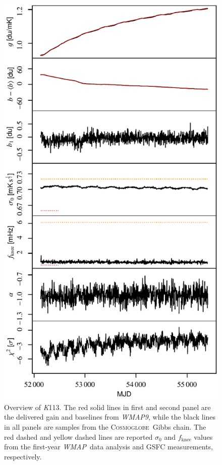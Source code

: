 \documentclass[twocolumn]{../../common/aa}
\def\WMAP{\emph{WMAP}}
\def\WMAPnine{\emph{WMAP9}}
\newcommand{\cosmoglobe}{\textsc{Cosmoglobe}}
\newcommand{\K}[0]{\textit K}
\begin{document}
\begin{figure}[t]
  	\centering
	\includegraphics[width=\linewidth]{figures/instpar_CG_K113_v1.pdf}
	\caption{Overview of \K113. The red solid lines in first and second panel  are the delivered gain and baselines from \WMAPnine, while the black lines in all panels are samples from the \cosmoglobe\ Gibbs chain. The red dashed and yellow dashed lines are reported $\sigma_0$ and $f_\mathrm{knee}$ values from the first-year \WMAP\ data analysis and GSFC measurements, respectively.}
	\label{fig:inst_K113}
\end{figure}
\end{document}
